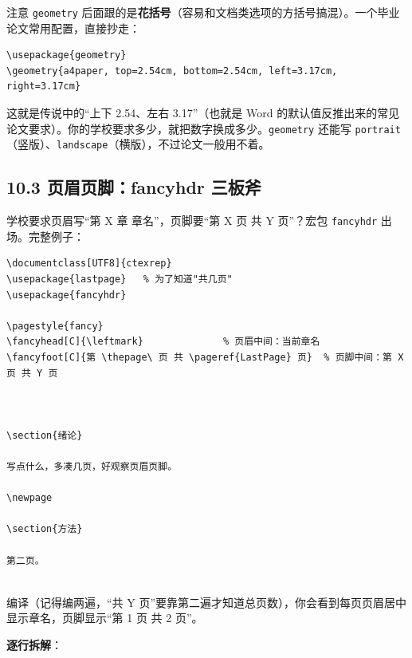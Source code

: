 注意 \texttt{geometry} 后面跟的是\textbf{花括号}（容易和文档类选项的方括号搞混）。一个毕业论文常用配置，直接抄走：

\begin{lstlisting}
\usepackage{geometry}
\geometry{a4paper, top=2.54cm, bottom=2.54cm, left=3.17cm, right=3.17cm}
\end{lstlisting}

这就是传说中的“上下 2.54、左右 3.17”（也就是 Word 的默认值反推出来的常见论文要求）。你的学校要求多少，就把数字换成多少。\texttt{geometry} 还能写 \texttt{portrait}（竖版）、\texttt{landscape}（横版），不过论文一般用不着。

\subsection*{10.3 页眉页脚：fancyhdr 三板斧}

学校要求页眉写“第 X 章 章名”，页脚要“第 X 页 共 Y 页”？宏包 \texttt{fancyhdr} 出场。完整例子：

\begin{lstlisting}
\documentclass[UTF8]{ctexrep}
\usepackage{lastpage}   % 为了知道"共几页"
\usepackage{fancyhdr}

\pagestyle{fancy}
\fancyhead[C]{\leftmark}              % 页眉中间：当前章名
\fancyfoot[C]{第 \thepage\ 页 共 \pageref{LastPage} 页}  % 页脚中间：第 X 页 共 Y 页



\section{绪论}

写点什么，多凑几页，好观察页眉页脚。

\newpage

\section{方法}

第二页。


\end{lstlisting}

编译（记得编两遍，“共 Y 页”要靠第二遍才知道总页数），你会看到每页页眉居中显示章名，页脚显示“第 1 页 共 2 页”。

\textbf{逐行拆解}：


